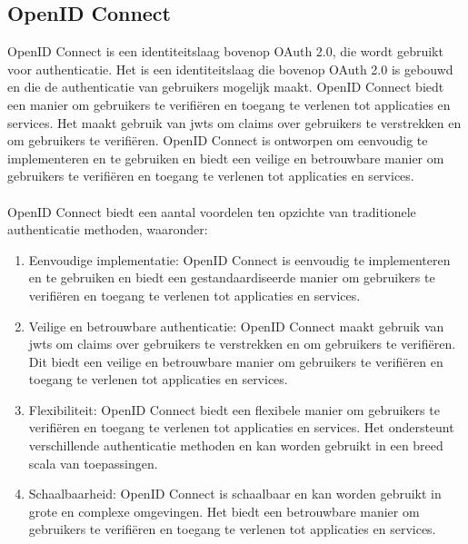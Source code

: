   \subsection{OpenID Connect}%
  \label{subsec:openid-connect}
  OpenID Connect is een identiteitslaag bovenop OAuth 2.0, die wordt gebruikt voor authenticatie. Het is een identiteitslaag die bovenop 
  OAuth 2.0 is gebouwd en die de authenticatie van gebruikers mogelijk maakt. OpenID Connect biedt een manier om gebruikers te verifiëren 
  en toegang te verlenen tot applicaties en services. Het maakt gebruik van \gls{jwts} om claims over gebruikers te verstrekken en om 
  gebruikers te verifiëren. OpenID Connect is ontworpen om eenvoudig te implementeren en te gebruiken en biedt een veilige en betrouwbare manier om 
  gebruikers te verifiëren en toegang te verlenen tot applicaties en services.
  \\
  \\
  OpenID Connect biedt een aantal voordelen ten opzichte van traditionele authenticatie methoden, waaronder:
  \begin{enumerate}[label=\textbf{-}]
      \item Eenvoudige implementatie: OpenID Connect is eenvoudig te implementeren en te gebruiken en biedt een gestandaardiseerde manier om gebruikers te verifiëren en toegang te verlenen tot applicaties en services.
      \item Veilige en betrouwbare authenticatie: OpenID Connect maakt gebruik van \gls{jwts} om claims over gebruikers te verstrekken en om gebruikers te verifiëren. Dit biedt een veilige en betrouwbare manier om gebruikers te verifiëren en toegang te verlenen tot applicaties en services.
      \item Flexibiliteit: OpenID Connect biedt een flexibele manier om gebruikers te verifiëren en toegang te verlenen tot applicaties en services. Het ondersteunt verschillende authenticatie methoden en kan worden gebruikt in een breed scala van toepassingen.
      \item Schaalbaarheid: OpenID Connect is schaalbaar en kan worden gebruikt in grote en complexe omgevingen. Het biedt een betrouwbare manier om gebruikers te verifiëren en toegang te verlenen tot applicaties en services.
  \end{enumerate}
  \autocite{Sakimura2014}


